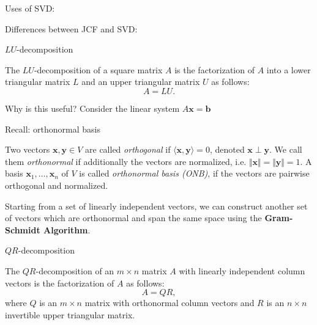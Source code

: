 \documentclass [aspectratio=169]{beamer}
\newcommand{\bx}{{\mathbf{x}}}
\newcommand{\by}{{\mathbf{y}}}
\newcommand{\innerprod}[1]{\langle #1 \rangle}
\begin{document}
\begin{frame}
Uses of SVD:

\vspace{3cm}

Differences between JCF and SVD:

\vspace{3cm}

\end{frame}

\begin{frame}{$LU$-decomposition}
\begin{definition}
The $LU$-decomposition of a square matrix $A$ is the factorization of $A$ into a lower triangular matrix $L$ and an upper triangular matrix $U$ as follows:
\begin{equation*}
    A = LU.
\end{equation*}
\end{definition}

Why is this useful? Consider the linear system $A \bx = \mathbf{b}$
\vspace{3cm}
\end{frame}

\begin{frame}{Recall: orthonormal basis}
\begin{definition}
Two vectors $\bx,\by \in V$ are called \emph{orthogonal} if $\innerprod{\bx,\by} = 0$, denoted $\bx \perp \by$. We call them \emph{orthonormal} if additionally the vectors are normalized, i.e. $\Vert \bx \Vert =\Vert \by\Vert = 1 $. A basis $\bx_1,\ldots, \bx_n$ of $V$ is called \emph{orthonormal basis (ONB)}, if the vectors are pairwise orthogonal and normalized.  
\end{definition}

\vspace{1em}

Starting from a set of linearly independent vectors, we can construct another set of vectors which are orthonormal and span the same space using the \textbf{\textcolor{deptoran}{Gram-Schmidt Algorithm}}.
\end{frame}



\begin{frame}{$QR$-decomposition}
\begin{definition}[$QR$-decomposition]
The $QR$-decomposition of an $m \times n$ matrix $A$ with linearly independent column vectors is the factorization of $A$ as follows:
\begin{equation*}
    A = QR,
\end{equation*}
where $Q$ is an $m \times n$ matrix with orthonormal column vectors and $R$ is an $n\times n$ invertible upper triangular matrix.
\end{definition}
\end{frame}
\end{document}
